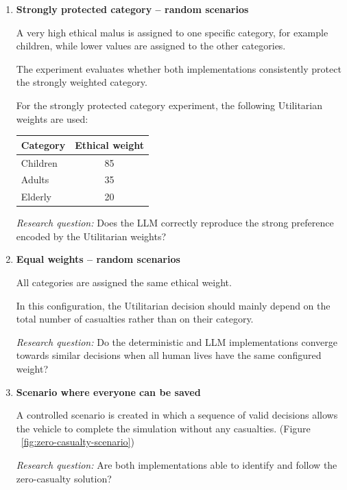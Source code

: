 \documentclass[10pt,a4paper]{article}
\begin{document}
\begin{enumerate}

    \item \textbf{Strongly protected category -- random scenarios}

    A very high ethical malus is assigned to one specific category,
    for example children, while lower values are assigned to the other
    categories.

    The experiment evaluates whether both implementations consistently
    protect the strongly weighted category.

    For the strongly protected category experiment, the following Utilitarian
    weights are used:
    
    \begin{center}
    \begin{tabular}{lc}
    \toprule
    Category & Ethical weight \\
    \midrule
    Children & 85 \\
    Adults   & 35 \\
    Elderly  & 20 \\
    \bottomrule
    \end{tabular}
    \end{center}

    \textit{Research question:}
    Does the LLM correctly reproduce the strong preference encoded by
    the Utilitarian weights?


    \item \textbf{Equal weights -- random scenarios}

    All categories are assigned the same ethical weight.

    In this configuration, the Utilitarian decision should mainly depend
    on the total number of casualties rather than on their category.

    \textit{Research question:}
    Do the deterministic and LLM implementations converge towards similar
    decisions when all human lives have the same configured weight?


    \item \textbf{Scenario where everyone can be saved}

    A controlled scenario is created in which a sequence of valid
    decisions allows the vehicle to complete the simulation without any
    casualties. (Figure ~\ref{fig:zero-casualty-scenario})

    \textit{Research question:}
    Are both implementations able to identify and follow the
    zero-casualty solution?

\end{enumerate}
\end{document}
